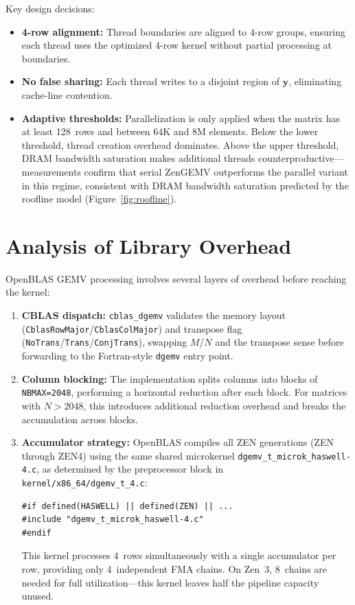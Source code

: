\documentclass[runningheads]{llncs}
\begin{document}
Key design decisions:
\begin{itemize}
\item \textbf{4-row alignment:} Thread boundaries are aligned to 4-row groups,
      ensuring each thread uses the optimized 4-row kernel without partial
      processing at boundaries.
\item \textbf{No false sharing:} Each thread writes to a disjoint region of
      $\mathbf{y}$, eliminating cache-line contention.
\item \textbf{Adaptive thresholds:} Parallelization is only applied when
      the matrix has at least 128~rows and between $64\text{K}$ and $8\text{M}$
      elements. Below the lower threshold, thread creation overhead dominates.
      Above the upper threshold, DRAM bandwidth saturation makes additional
      threads counterproductive---measurements confirm that serial ZenGEMV
      outperforms the parallel variant in this regime, consistent with DRAM
      bandwidth saturation predicted by the roofline model (Figure~\ref{fig:roofline}).
\end{itemize}


\section{Analysis of Library Overhead}

OpenBLAS GEMV processing involves several layers of overhead before reaching the kernel:

\begin{enumerate}
\item \textbf{CBLAS dispatch:} \texttt{cblas\_dgemv} validates the memory
      layout (\texttt{CblasRowMajor}/\texttt{CblasColMajor}) and transpose
      flag (\texttt{NoTrans}/\texttt{Trans}/\texttt{ConjTrans}), swapping
      $M$/$N$ and the transpose sense before forwarding to the Fortran-style
      \texttt{dgemv} entry point.
\item \textbf{Column blocking:} The implementation splits columns into blocks
      of \texttt{NBMAX=2048}, performing a horizontal reduction after each block.
      For matrices with $N > 2048$, this introduces additional reduction overhead
      and breaks the accumulation across blocks.
\item \textbf{Accumulator strategy:} OpenBLAS compiles all ZEN generations
      (ZEN through ZEN4) using the same shared microkernel
      \texttt{dgemv\_t\_microk\_haswell-4.c}, as determined by the preprocessor
      block in \texttt{kernel/x86\_64/dgemv\_t\_4.c}:
      \begin{verbatim}
#if defined(HASWELL) || defined(ZEN) || ...
#include "dgemv_t_microk_haswell-4.c"
#endif
      \end{verbatim}
      This kernel processes 4~rows simultaneously with a single accumulator
      per row, providing only 4~independent FMA chains. On Zen~3, 8~chains are needed for
      full utilization---this kernel leaves half the pipeline capacity unused.
\end{enumerate}
\end{document}
